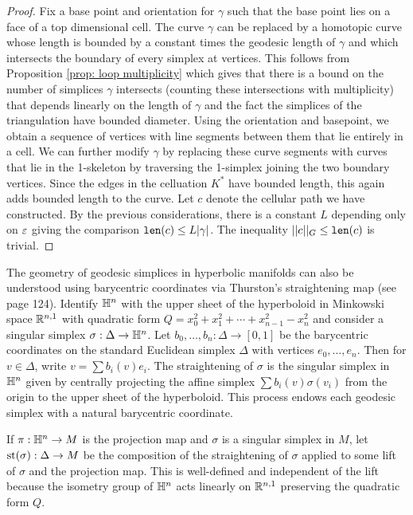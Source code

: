 \begin{proof}

Fix a base point and orientation for $\gamma$ such that the base point lies on a face of a top dimensional cell. The curve $\gamma$ can be replaced by a homotopic curve whose length is bounded by a constant times the geodesic length of $\gamma$ and which intersects the boundary of every simplex at vertices. This follows from Proposition \ref{prop: loop multiplicity} which gives that there is a bound on the number of simplices $\gamma$ intersects (counting these intersections with multiplicity) that depends linearly on the length of $\gamma$ and the fact the simplices of the triangulation have bounded diameter. Using the orientation and basepoint, we obtain a sequence of vertices with line segments between them that lie entirely in a cell. We can further modify $\gamma$ by replacing these curve segments with curves that lie in the 1-skeleton by traversing the 1-simplex joining the two boundary vertices. Since the edges in the celluation $K^*$ have bounded length, this again adds bounded length to the curve. Let $c$ denote the cellular path we have constructed. By the previous considerations, there is a constant $L$ depending only on $\varepsilon$ giving the comparison $\operatorname{{\tt{len}}}(c)\leq L|\gamma|$. The inequality $||c||_G\leq \operatorname{{\tt{len}}}(c)$ is trivial.

\end{proof}


The geometry of geodesic simplices in hyperbolic manifolds can also be understood using barycentric coordinates via Thurston’s straightening map (see \cite{thurstonbook} page 124). Identify $\mathbb H^n$ with the upper sheet of the hyperboloid in Minkowski space $\mathbb R^{n,1}$ with quadratic form $Q = x_0^2 + x_1^2 + \cdots + x_{n-1}^2 - x_n^2$ and consider a singular simplex $\sigma:\Delta\to \mathbb H^n$.
Let $b_0, \dots, b_n:\Delta\to [0,1]$ be the barycentric coordinates on the standard Euclidean simplex $\Delta$ with vertices $e_0,\dots, e_n$. Then for $v\in \Delta$, write $v = \sum b_i(v)e_i$. The straightening of $\sigma$ is the singular simplex in $\mathbb H^n$ given by centrally projecting the affine simplex $\sum b_i(v)\sigma(v_i)$ from the origin to the upper sheet of the hyperboloid. This process endows each geodesic simplex with a natural barycentric coordinate.

If $\pi:\mathbb H^n\to M$ is the projection map and $\sigma$ is a singular simplex in $M$, let $\text{st}(\sigma):\Delta\to M$ be the composition of the straightening of $\sigma$ applied to some lift of $\sigma$ and the projection map.
This is well-defined and independent of the lift because the isometry group of $\mathbb H^n$ acts linearly on $\mathbb R^{n,1}$ preserving the quadratic form $Q$.

